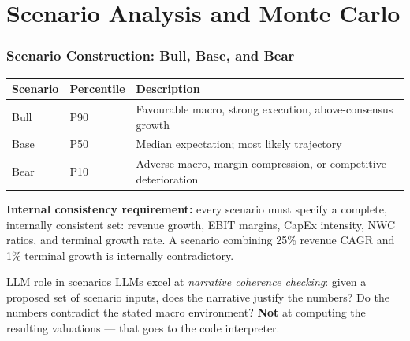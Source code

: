 \documentclass[9pt,t]{beamer}
\begin{document}
\section{Scenario Analysis and Monte Carlo}

\begin{frame}
\frametitle{Scenario Construction: Bull, Base, and Bear}

\begin{center}
\begin{tabular}{lll}
\toprule
\textbf{Scenario} & \textbf{Percentile} & \textbf{Description} \\
\midrule
Bull & P90 & Favourable macro, strong execution, above-consensus growth \\
Base & P50 & Median expectation; most likely trajectory \\
Bear & P10 & Adverse macro, margin compression, or competitive deterioration \\
\bottomrule
\end{tabular}
\end{center}

\medskip
\textbf{Internal consistency requirement:} every scenario must specify a complete,
internally consistent set: revenue growth, EBIT margins, CapEx intensity, NWC ratios,
and terminal growth rate. A scenario combining 25\% revenue CAGR and 1\% terminal growth
is internally contradictory.

\medskip
\begin{block}{LLM role in scenarios}
LLMs excel at \emph{narrative coherence checking}: given a proposed set of scenario inputs,
does the narrative justify the numbers? Do the numbers contradict the stated macro environment?
\textbf{Not} at computing the resulting valuations --- that goes to the code interpreter.
\end{block}
\end{frame}
\end{document}
